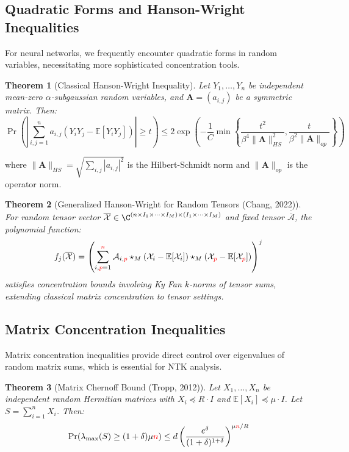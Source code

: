\documentclass[a4paper]{article}
\newcommand{\E}{\mathbb{E}}
\theoremstyle{plain}
\newtheorem{theorem}{Theorem}[section]
\theoremstyle{definition}
\theoremstyle{remark}
\begin{document}
\subsection{Quadratic Forms and Hanson-Wright Inequalities}

For neural networks, we frequently encounter quadratic forms in random variables, necessitating more sophisticated concentration tools.

\begin{theorem}[Classical Hanson-Wright Inequality]
Let $Y_1, \ldots, Y_n$ be independent mean-zero $\alpha$-subgaussian random variables, and $\mathbf{A} = (a_{i,j})$ be a symmetric matrix. Then:
$$\Pr\left(\left|\sum_{i,j=1}^n a_{i,j}(Y_i Y_j - \E[Y_i Y_j])\right| \geq t\right) \leq 2\exp\left(-\frac{1}{C}\min\left\{\frac{t^2}{\beta^4\|\mathbf{A}\|_{HS}^2}, \frac{t}{\beta^2\|\mathbf{A}\|_{op}}\right\}\right)$$
\end{theorem}

where $\|\mathbf{A}\|_{HS} = \sqrt{\sum_{i,j} |a_{i,j}|^2}$ is the Hilbert-Schmidt norm and $\|\mathbf{A}\|_{op}$ is the operator norm.

\begin{theorem}[Generalized Hanson-Wright for Random Tensors (Chang, 2022)]
For random tensor vector $\overline{\mathcal{X}} \in \C^{(n \times I_1 \times \cdots \times I_M) \times (I_1 \times \cdots \times I_M)}$ and fixed tensor $\overline{\overline{\mathcal{A}}}$, the polynomial function:
$$f_j(\overline{\mathcal{X}}) = \left(\sum_{i,\textcolor{red}{p}=1}^{\textcolor{red}{n}} \mathcal{A}_{i,\textcolor{red}{p}} \star_M (\mathcal{X}_i - \E[\mathcal{X}_i]) \star_M (\mathcal{X}_{\textcolor{red}{p}} - \E[\mathcal{X}_{\textcolor{red}{p}}])\right)^j$$
satisfies concentration bounds involving Ky Fan $k$-norms of tensor sums, extending classical matrix concentration to tensor settings.
\end{theorem}

\subsection{Matrix Concentration Inequalities}

Matrix concentration inequalities provide direct control over eigenvalues of random matrix sums, which is essential for NTK analysis.

\begin{theorem}[Matrix Chernoff Bound (Tropp, 2012)]
Let $X_1, \ldots, X_n$ be independent random Hermitian matrices with $X_i \preceq R \cdot I$ and $\E[X_i] \preceq \mu \cdot I$. Let $S = \sum_{i=1}^n X_i$. Then:
$$\Pr(\lambda_{\max}(S) \geq (1+\delta)\mu \textcolor{red}{n}) \leq d \left(\frac{e^\delta}{(1+\delta)^{1+\delta}}\right)^{\mu \textcolor{red}{n} / R}$$
\end{theorem}
\end{document}
